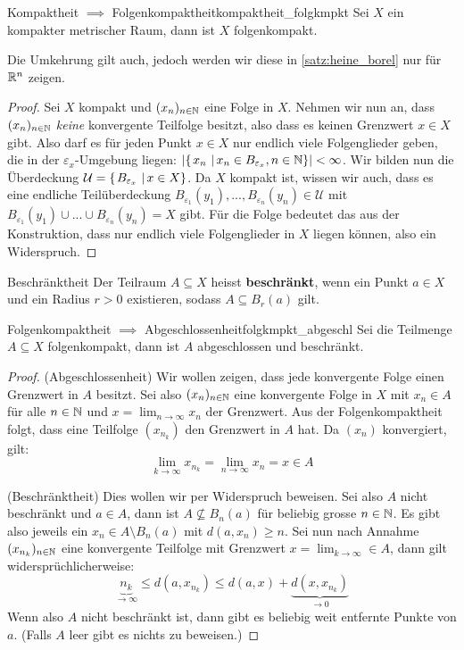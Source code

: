 \begin{lemma}{Kompaktheit $\implies$ Folgenkompaktheit}{kompaktheit_folgkmpkt}
Sei $X$ ein kompakter metrischer Raum, dann ist $X$ folgenkompakt.
\end{lemma}
\begin{remark}
Die Umkehrung gilt auch, jedoch werden wir diese in \ref{satz:heine_borel} nur für $\mathbb{R}^n$ zeigen.
\end{remark}
\begin{proof}
Sei $X$ kompakt und $(x_n)_{n \in \mathbb{N}}$ eine Folge in $X$. Nehmen wir nun an, dass $(x_n)_{n \in \mathbb{N}}$ \textit{keine} konvergente Teilfolge besitzt, also dass es keinen Grenzwert $x \in X$ gibt. Also darf es für jeden Punkt $x \in X$ nur endlich viele Folgenglieder geben, die in der $\varepsilon_x$-Umgebung liegen: $\left|\left\{\left.x_n \ \right| x_n \in B_{\varepsilon_x}, n \in \mathbb{N} \right\}\right| < \infty$. Wir bilden nun die Überdeckung $\mathcal{U} = \left\{\left.B_{\varepsilon_x} \ \right| x \in X \right\}$. Da $X$ kompakt ist, wissen wir auch, dass es eine endliche Teilüberdeckung $B_{\varepsilon_1}(y_1),..., B_{\varepsilon_n}(y_n) \in \mathcal{U}$ mit $B_{\varepsilon_1}(y_1) \cup ... \cup B_{\varepsilon_n}(y_n) = X$ gibt. Für die Folge bedeutet das aus der Konstruktion, dass nur endlich viele Folgenglieder in $X$ liegen können, also ein Widerspruch.
\end{proof}

\begin{definition}{Beschränktheit}{}
Der Teilraum $A \subseteq X$ heisst \textbf{beschränkt}, wenn ein Punkt $a \in X$ und ein Radius $r > 0$ existieren, sodass $A \subseteq B_r(a)$ gilt.
\end{definition}

\begin{lemma}{Folgenkompaktheit $\implies$ Abgeschlossenheit}{folgkmpkt_abgeschl}
Sei die Teilmenge $A \subseteq X$ folgenkompakt, dann ist $A$ abgeschlossen und beschränkt.
\end{lemma}

\begin{proof}
(Abgeschlossenheit) Wir wollen zeigen, dass jede konvergente Folge einen Grenzwert in $A$ besitzt. Sei also $(x_n)_{n \in \mathbb{N}}$ eine konvergente Folge in $X$ mit $x_n \in A$ für alle $n \in \mathbb{N}$ und $x = \lim_{n \to \infty} x_n$ der Grenzwert. Aus der Folgenkompaktheit folgt, dass eine Teilfolge $(x_{n_k})$ den Grenzwert in $A$ hat. Da $(x_n)$ konvergiert, gilt:
$$\lim_{k \to \infty}x_{n_k} = \lim_{n \to \infty} x_n = x \in A$$

(Beschränktheit) Dies wollen wir per Widerspruch beweisen. Sei also $A$ nicht beschränkt und $a \in A$, dann ist $A \nsubseteq B_n(a)$ für beliebig grosse $n \in \mathbb{N}$. Es gibt also jeweils ein $x_n \in A \setminus B_n(a)$ mit $d(a,x_n) \geq n$. Sei nun nach Annahme $(x_{n_k})_{n \in \mathbb{N}}$ eine konvergente Teilfolge mit Grenzwert $x = \lim_{k \to \infty} \in A$, dann gilt widersprüchlicherweise:
$$\underbrace{n_k}_{\to \infty} \leq d(a, x_{n_k}) \leq d(a,x) + \underbrace{d(x,x_{n_k})}_{\to 0}$$
Wenn also $A$ nicht beschränkt ist, dann gibt es beliebig weit entfernte Punkte von $a$. 
(Falls $A$ leer gibt es nichts zu beweisen.)
\end{proof}

